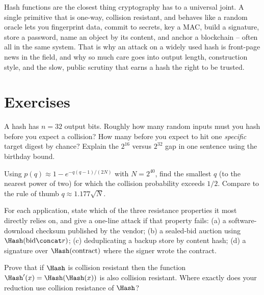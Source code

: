 \begin{aestheticbox}
Hash functions are the closest thing cryptography has to a universal joint. A single primitive that is one-way, collision resistant, and behaves like a random oracle lets you fingerprint data, commit to secrets, key a MAC, build a signature, store a password, name an object by its content, and anchor a blockchain -- often all in the same system. That is why an attack on a widely used hash is front-page news in the field, and why so much care goes into output length, construction style, and the slow, public scrutiny that earns a hash the right to be trusted.
\end{aestheticbox}

\section{Exercises}
\label{ch14:exercises}

\begin{exercise}
A hash has $n = 32$ output bits. Roughly how many random inputs must you hash before you expect a collision? How many before you expect to hit one \emph{specific} target digest by chance? Explain the $2^{16}$ versus $2^{32}$ gap in one sentence using the birthday bound.
\end{exercise}

\begin{exercise}
Using $p(q) \approx 1 - e^{-q(q-1)/(2N)}$ with $N = 2^{40}$, find the smallest $q$ (to the nearest power of two) for which the collision probability exceeds $1/2$. Compare to the rule of thumb $q \approx 1.177\sqrt{N}$.
\end{exercise}

\begin{exercise}
For each application, state which of the three resistance properties it most directly relies on, and give a one-line attack if that property fails: (a) a software-download checksum published by the vendor; (b) a sealed-bid auction using $\Hash(\text{bid}\concat r)$; (c) deduplicating a backup store by content hash; (d) a signature over $\Hash(\text{contract})$ where the signer wrote the contract.
\end{exercise}

\begin{exercise}[Reduction]
Prove that if $\Hash$ is collision resistant then the function $\Hash'(x) = \Hash(\Hash(x))$ is also collision resistant. Where exactly does your reduction use collision resistance of $\Hash$?
\end{exercise}

